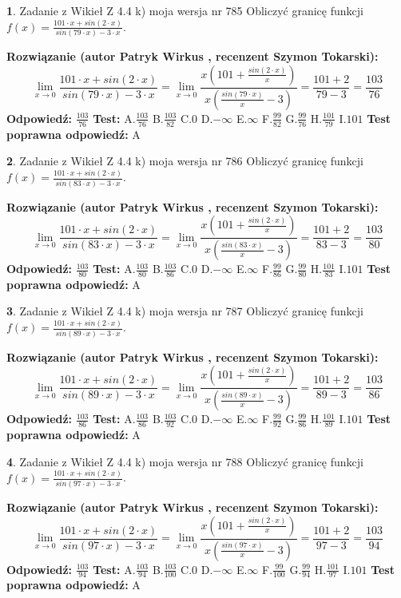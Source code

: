 \documentclass[12pt, a4paper]{article}
\theoremstyle{definition} %
\newtheorem{zad}{}
\newcommand{\zadStart}[1]{\begin{zad}#1\newline}
\newcommand{\zadStop}{\end{zad}}
\newcommand{\rozwStart}[2]{\noindent \textbf{Rozwiązanie (autor #1 , recenzent #2): }\newline}
\newcommand{\rozwStop}{\newline}
\newcommand{\odpStart}{\noindent \textbf{Odpowiedź:}\newline}
\newcommand{\odpStop}{\newline}
\newcommand{\testStart}{\noindent \textbf{Test:}\newline}
\newcommand{\testStop}{\newline}
\newcommand{\kluczStart}{\noindent \textbf{Test poprawna odpowiedź:}\newline}
\newcommand{\kluczStop}{\newline}
\begin{document}
\zadStart{Zadanie z Wikieł Z 4.4 k) moja wersja nr 785}
Obliczyć granicę funkcji $f(x)=\frac{101\cdot x +sin(2\cdot x)}{sin(79\cdot x) -3\cdot x}$.
\zadStop
\rozwStart{Patryk Wirkus}{Szymon Tokarski}
$$\lim\limits_{x\to 0}\frac{101\cdot x +sin(2\cdot x)}{sin(79\cdot x) -3\cdot x}
=\lim\limits_{x\to 0}\frac{x(101+\frac{sin(2\cdot x)}{x})}{x(\frac{sin(79\cdot x)}{x}-3)}
=\frac{101+2}{79-3} = \frac{103}{76}$$
\rozwStop
\odpStart
$\frac{103}{76}$
\odpStop
\testStart
A.$\frac{103}{76}$
B.$\frac{103}{82}$
C.$0$
D.$-\infty$
E.$\infty$
F.$\frac{99}{82}$
G.$\frac{99}{76}$
H.$\frac{101}{79}$
I.$101$
\testStop
\kluczStart
A
\kluczStop



\zadStart{Zadanie z Wikieł Z 4.4 k) moja wersja nr 786}
Obliczyć granicę funkcji $f(x)=\frac{101\cdot x +sin(2\cdot x)}{sin(83\cdot x) -3\cdot x}$.
\zadStop
\rozwStart{Patryk Wirkus}{Szymon Tokarski}
$$\lim\limits_{x\to 0}\frac{101\cdot x +sin(2\cdot x)}{sin(83\cdot x) -3\cdot x}
=\lim\limits_{x\to 0}\frac{x(101+\frac{sin(2\cdot x)}{x})}{x(\frac{sin(83\cdot x)}{x}-3)}
=\frac{101+2}{83-3} = \frac{103}{80}$$
\rozwStop
\odpStart
$\frac{103}{80}$
\odpStop
\testStart
A.$\frac{103}{80}$
B.$\frac{103}{86}$
C.$0$
D.$-\infty$
E.$\infty$
F.$\frac{99}{86}$
G.$\frac{99}{80}$
H.$\frac{101}{83}$
I.$101$
\testStop
\kluczStart
A
\kluczStop



\zadStart{Zadanie z Wikieł Z 4.4 k) moja wersja nr 787}
Obliczyć granicę funkcji $f(x)=\frac{101\cdot x +sin(2\cdot x)}{sin(89\cdot x) -3\cdot x}$.
\zadStop
\rozwStart{Patryk Wirkus}{Szymon Tokarski}
$$\lim\limits_{x\to 0}\frac{101\cdot x +sin(2\cdot x)}{sin(89\cdot x) -3\cdot x}
=\lim\limits_{x\to 0}\frac{x(101+\frac{sin(2\cdot x)}{x})}{x(\frac{sin(89\cdot x)}{x}-3)}
=\frac{101+2}{89-3} = \frac{103}{86}$$
\rozwStop
\odpStart
$\frac{103}{86}$
\odpStop
\testStart
A.$\frac{103}{86}$
B.$\frac{103}{92}$
C.$0$
D.$-\infty$
E.$\infty$
F.$\frac{99}{92}$
G.$\frac{99}{86}$
H.$\frac{101}{89}$
I.$101$
\testStop
\kluczStart
A
\kluczStop



\zadStart{Zadanie z Wikieł Z 4.4 k) moja wersja nr 788}
Obliczyć granicę funkcji $f(x)=\frac{101\cdot x +sin(2\cdot x)}{sin(97\cdot x) -3\cdot x}$.
\zadStop
\rozwStart{Patryk Wirkus}{Szymon Tokarski}
$$\lim\limits_{x\to 0}\frac{101\cdot x +sin(2\cdot x)}{sin(97\cdot x) -3\cdot x}
=\lim\limits_{x\to 0}\frac{x(101+\frac{sin(2\cdot x)}{x})}{x(\frac{sin(97\cdot x)}{x}-3)}
=\frac{101+2}{97-3} = \frac{103}{94}$$
\rozwStop
\odpStart
$\frac{103}{94}$
\odpStop
\testStart
A.$\frac{103}{94}$
B.$\frac{103}{100}$
C.$0$
D.$-\infty$
E.$\infty$
F.$\frac{99}{100}$
G.$\frac{99}{94}$
H.$\frac{101}{97}$
I.$101$
\testStop
\kluczStart
A
\kluczStop
\end{document}
